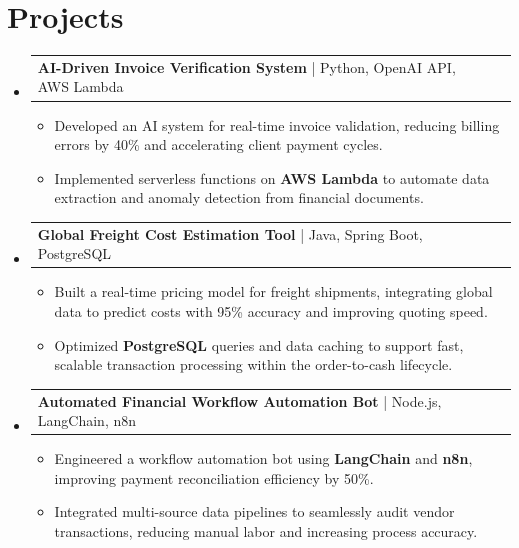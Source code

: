 \documentclass[letterpaper,11pt]{article}
\makeatletter
\newcommand{\resumeItem}[1]{
  \item\footnotesize{
    {#1 \vspace{-2pt}}
  }
}
\newcommand{\resumeProjectHeading}[2]{
    \item
    \begin{tabular*}{1.001\textwidth}{l@{\extracolsep{\fill}}r}
      \small#1 & \textbf{\small #2}\\
    \end{tabular*}\vspace{-7pt}
}
\newcommand{\resumeSubHeadingListStart}{\begin{itemize}[leftmargin=0pt, label={}]}
\newcommand{\resumeSubHeadingListEnd}{\end{itemize}}
\newcommand{\resumeItemListStart}{\begin{itemize}[leftmargin=*]}
\newcommand{\resumeItemListEnd}{\end{itemize}\vspace{-5pt}}
\makeatother
\begin{document}
\section{Projects}
    \vspace{-5pt}
    \resumeSubHeadingListStart
      \resumeProjectHeading
          {\textbf{AI-Driven Invoice Verification System} | Python, OpenAI API, AWS Lambda}{}
          \resumeItemListStart
              \resumeItem{Developed an AI system for real-time invoice validation, reducing billing errors by 40\% and accelerating client payment cycles.}
              \resumeItem{Implemented serverless functions on \textbf{AWS Lambda} to automate data extraction and anomaly detection from financial documents.}
          \resumeItemListEnd
          \vspace{-12pt}
      \resumeProjectHeading
          {\textbf{Global Freight Cost Estimation Tool} | Java, Spring Boot, PostgreSQL}{}
          \resumeItemListStart
              \resumeItem{Built a real-time pricing model for freight shipments, integrating global data to predict costs with 95\% accuracy and improving quoting speed.}
              \resumeItem{Optimized \textbf{PostgreSQL} queries and data caching to support fast, scalable transaction processing within the order-to-cash lifecycle.}
          \resumeItemListEnd
          \vspace{-12pt}
      \resumeProjectHeading
          {\textbf{Automated Financial Workflow Automation Bot} | Node.js, LangChain, n8n}{}
          \resumeItemListStart
              \resumeItem{Engineered a workflow automation bot using \textbf{LangChain} and \textbf{n8n}, improving payment reconciliation efficiency by 50\%.}
              \resumeItem{Integrated multi-source data pipelines to seamlessly audit vendor transactions, reducing manual labor and increasing process accuracy.}
          \resumeItemListEnd
    \resumeSubHeadingListEnd
\end{document}
